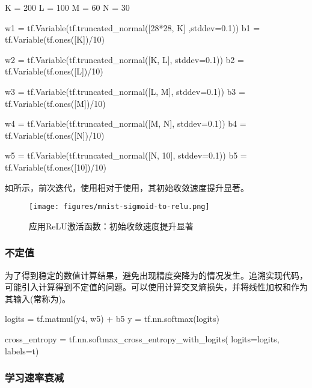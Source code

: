 \begin{content}
\begin{content}
\begin{leftbar}
\begin{python}
K = 200
L = 100
M = 60
N = 30

w1 = tf.Variable(tf.truncated_normal([28*28, K] ,stddev=0.1)) 
b1 = tf.Variable(tf.ones([K])/10)

w2 = tf.Variable(tf.truncated_normal([K, L], stddev=0.1))
b2 = tf.Variable(tf.ones([L])/10)

w3 = tf.Variable(tf.truncated_normal([L, M], stddev=0.1)) 
b3 = tf.Variable(tf.ones([M])/10)

w4 = tf.Variable(tf.truncated_normal([M, N], stddev=0.1)) 
b4 = tf.Variable(tf.ones([N])/10)

w5 = tf.Variable(tf.truncated_normal([N, 10], stddev=0.1)) 
b5 = tf.Variable(tf.ones([10])/10)
\end{python}
\end{leftbar}

如所示，前次迭代，使用相对于使用，其初始收敛速度提升显著。

\begin{figure}[H]
\centering
\texttt{[image: figures/mnist-sigmoid-to-relu.png]}
\caption{应用ReLU激活函数：初始收敛速度提升显著}
 \label{fig:mnist-sigmoid-to-relu}
\end{figure}

\subsubsection{不定值}

为了得到稳定的数值计算结果，避免出现精度突降为的情况发生。追溯实现代码，可能引入计算得到不定值的问题。可以使用计算交叉熵损失，并将线性加权和作为其输入(常称为)。

\begin{leftbar}
\begin{python}
logits = tf.matmul(y4, w5) + b5
y = tf.nn.softmax(logits)

cross_entropy = tf.nn.softmax_cross_entropy_with_logits(
  logits=logits, labels=t)
\end{python}
\end{leftbar}

\subsubsection{学习速率衰减}


\end{content}
\end{content}
